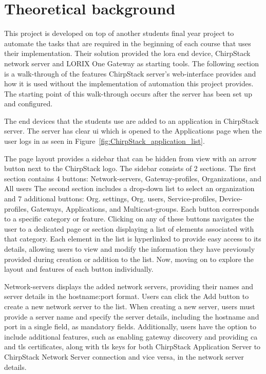 
\chapter{Theoretical background} \label{ch:theor_backgr}

This project is developed on top of another students final year project \cite{theseus:gere-zoltan} to automate the tasks that are required in the beginning of each course that uses their implementation.
Their solution provided the \gls{lora} end device, ChirpStack network server and LORIX One Gateway as starting tools.
The following section is a walk-through of the features ChirpStack server's web-interface provides and how it is used without the implementation of automation this project provides.
The starting point of this walk-through occurs after the server has been set up and configured.

The end devices that the students use are added to an application in ChirpStack server.
The server has clear \gls{ui} which is opened to the Applications page when the user logs in as seen in Figure~\ref{fig:ChirpStack_application_list}.

The page layout provides a sidebar that can be hidden from view with an arrow button next to the ChirpStack logo.
The sidebar consists of 2 sections.
The first section contains 4 buttons: Network-servers, Gateway-profiles, Organizations, and All users
The second section includes a drop-down list to select an organization and 7 additional buttons: Org. settings, Org. users, Service-profiles, Device-profiles, Gateways, Applications, and Multicast-groups.
Each button corresponds to a specific category or feature.
Clicking on any of these buttons navigates the user to a dedicated page or section displaying a list of elements associated with that category.
Each element in the list is hyperlinked to provide easy access to its details, allowing users to view and modify the information they have previously provided during creation or addition to the list.
Now, moving on to explore the layout and features of each button individually.

Network-servers displays the added network servers, providing their names and server details in the hostname:port format.
Users can click the Add button to create a new network server to the list.
When creating a new server, users must provide a server name and specify the server details, including the hostname and port in a single field, as mandatory fields.
Additionally, users have the option to include additional features, such as enabling gateway discovery and providing \gls{ca} and \gls{tls} certificates, along with \gls{tls} keys for both ChirpStack Application Server to ChirpStack Network Server connection and vice versa, in the network server details.

